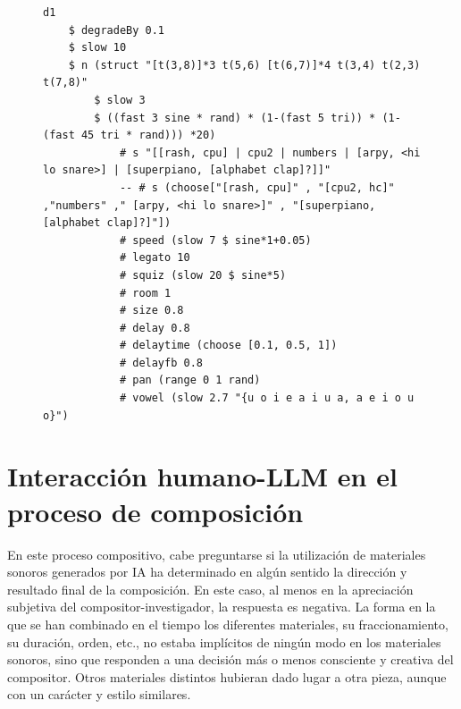\begin{figure}[H]
    \centering
    \begin{lstlisting}[style=SuperCollider-IDE, basicstyle=\footnotesize\ttfamily, numbers=none]
d1 
    $ degradeBy 0.1
    $ slow 10 
    $ n (struct "[t(3,8)]*3 t(5,6) [t(6,7)]*4 t(3,4) t(2,3) t(7,8)"
        $ slow 3 
        $ ((fast 3 sine * rand) * (1-(fast 5 tri)) * (1-(fast 45 tri * rand))) *20) 
            # s "[[rash, cpu] | cpu2 | numbers | [arpy, <hi lo snare>] | [superpiano, [alphabet clap]?]]" 
            -- # s (choose["[rash, cpu]" , "[cpu2, hc]" ,"numbers" ," [arpy, <hi lo snare>]" , "[superpiano, [alphabet clap]?]"])
            # speed (slow 7 $ sine*1+0.05) 
            # legato 10
            # squiz (slow 20 $ sine*5)
            # room 1
            # size 0.8
            # delay 0.8
            # delaytime (choose [0.1, 0.5, 1])
            # delayfb 0.8
            # pan (range 0 1 rand)
            # vowel (slow 2.7 "{u o i e a i u a, a e i o u o}")
    \end{lstlisting}
    \source{\propio}
    \label{fig:ejemplo_tidal_irregular}
\end{figure}

\section{Interacción humano-LLM en el proceso de composición}

En este proceso compositivo, cabe preguntarse si la utilización de materiales sonoros generados por IA ha determinado en algún sentido la dirección y resultado final de la composición. En este caso, al menos en la apreciación subjetiva del compositor-investigador, la respuesta es negativa. La forma en la que se han combinado en el tiempo los diferentes materiales, su fraccionamiento, su duración, orden, etc., no estaba implícitos de ningún modo en los materiales sonoros, sino que responden a una decisión más o menos consciente y creativa del compositor. Otros materiales distintos hubieran dado lugar a otra pieza, aunque con un carácter y estilo similares. 


